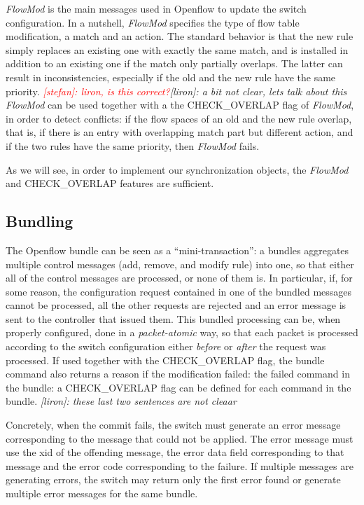 \documentclass[conference]{sigcomm-alternate}
\newcommand{\stefan}[1]{\textit{\textcolor{red}{[stefan]: #1}}} %
\newcommand{\liron}[1]{\textit{\textcolor{mygreen}{[liron]: #1}}} %
\begin{document}
\emph{FlowMod} is the main messages used in Openflow 
to update the switch configuration. 
In a nutshell, \emph{FlowMod} specifies the type of flow table modification,
a match and an action. 
The standard behavior is that the new rule simply replaces an existing one
with exactly the same match, and is installed
in addition to an existing one if the match only
partially overlaps. The latter can result
in inconsistencies, especially if the old and the new rule
have the same priority. \stefan{liron, is this correct?}\liron{a bit not clear, lets talk about this}
\emph{FlowMod} can be used together with a the CHECK\_OVERLAP flag
of \emph{FlowMod}, in order to detect conflicts: if the flow spaces of an old
and the new rule overlap, 
that is, if there is an entry with overlapping match part but different action, 
 and if the two rules have the same priority, then 
\emph{FlowMod} fails. 

As we will see, in order to implement our synchronization objects,
the \emph{FlowMod} and CHECK\_OVERLAP features are sufficient.


\subsection{Bundling}

The Openflow bundle can be seen as a ``mini-transaction'':
a bundles aggregates multiple control messages (add, remove, and modify rule)
into one, so that either all of the control messages are
processed, or none of them is. In particular, if, for some reason, the
configuration request contained in one of the bundled messages cannot
be processed, all the other requests  are rejected and an error
message is sent to the controller that issued them.
This bundled processing can be, when properly configured, done in a
\emph{packet-atomic} way, so that each packet is processed according
to the switch configuration either \emph{before} or \emph{after} the
request was processed.
If used together with the CHECK\_OVERLAP flag, the bundle command also returns a reason 
if the modification failed: the failed command in the bundle:
a CHECK\_OVERLAP flag can be defined for each command in the bundle.
\liron{these last two sentences are not cleaar}

Concretely, when the commit fails, the switch must generate an error message corresponding to the
message that could not be applied. The error message must use the xid of the offending message,
the error data field corresponding to that message and the error code corresponding to the failure. If
multiple messages are generating errors, the switch may return only the first error found or generate
multiple error messages for the same bundle.
\end{document}
